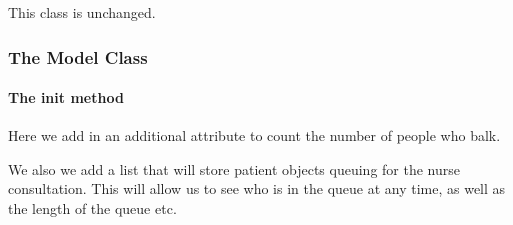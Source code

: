 \documentclass[
  letterpaper,
  DIV=11,
  numbers=noendperiod]{scrreprt}
\let\oldparagraph\paragraph
\renewcommand{\paragraph}[1]{\oldparagraph{#1}\mbox{}}
\begin{document}
This class is unchanged.

\subsubsection{The Model Class}\label{the-model-class-5}

\paragraph{\texorpdfstring{The \textbf{init}
method}{The init method}}\label{the-init-method-4}

Here we add in an additional attribute to count the number of people who
balk.

We also we add a list that will store patient objects queuing for the
nurse consultation. This will allow us to see who is in the queue at any
time, as well as the length of the queue etc.
\end{document}
